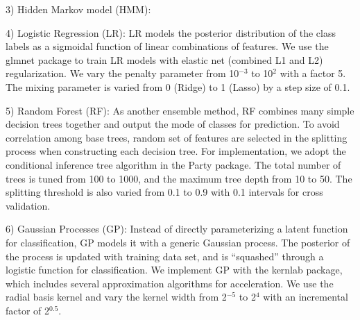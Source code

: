 3) Hidden Markov model (HMM):

4) Logistic Regression (LR): LR models the posterior distribution of the class labels as a sigmoidal function of linear combinations of features. We use the glmnet package to train LR models with elastic net (combined L1 and L2) regularization. We vary the penalty parameter from 10$^{-3}$ to 10$^2$ with a factor 5. The mixing parameter is varied from 0 (Ridge) to 1 (Lasso) by a step size of 0.1.

5) Random Forest (RF): As another ensemble method, RF combines many simple decision trees together and output the mode of classes for prediction. To avoid correlation among base trees, random set of features are selected in the splitting process when constructing each decision tree. For implementation, we adopt the conditional inference tree algorithm in the Party package. The total number of trees is tuned from 100 to 1000, and the maximum tree depth from 10 to 50. The splitting threshold is also varied from 0.1 to 0.9 with 0.1 intervals for cross validation.

6) Gaussian Processes (GP): Instead of directly parameterizing a latent function for classification, GP models it with a generic Gaussian process. The posterior of the process is updated with training data set, and is “squashed” through a logistic function for classification. We implement GP with the kernlab package, which includes several approximation algorithms for acceleration. We use the radial basis kernel and vary the kernel width from 2$^{-5}$ to 2$^4$ with an incremental factor of 2$^{0.5}$.





